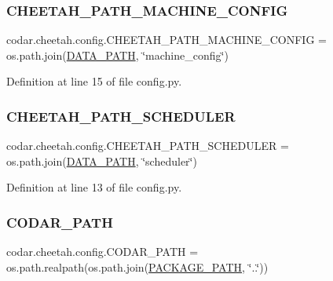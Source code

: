 \subsubsection{\texorpdfstring{C\+H\+E\+E\+T\+A\+H\+\_\+\+P\+A\+T\+H\+\_\+\+M\+A\+C\+H\+I\+N\+E\+\_\+\+C\+O\+N\+F\+IG}{CHEETAH\_PATH\_MACHINE\_CONFIG}}
{\footnotesize\ttfamily codar.\+cheetah.\+config.\+C\+H\+E\+E\+T\+A\+H\+\_\+\+P\+A\+T\+H\+\_\+\+M\+A\+C\+H\+I\+N\+E\+\_\+\+C\+O\+N\+F\+IG = os.\+path.\+join(\hyperlink{namespacecodar_1_1cheetah_1_1config_a87c807c2d48e4f9bb206c1d6afde26b5}{D\+A\+T\+A\+\_\+\+P\+A\+TH}, \char`\"{}machine\+\_\+config\char`\"{})}



Definition at line 15 of file config.\+py.

\mbox{\label{namespacecodar_1_1cheetah_1_1config_ae6c35df28d3aa0b6f7095d2d0c7d3dc8}} 
\subsubsection{\texorpdfstring{C\+H\+E\+E\+T\+A\+H\+\_\+\+P\+A\+T\+H\+\_\+\+S\+C\+H\+E\+D\+U\+L\+ER}{CHEETAH\_PATH\_SCHEDULER}}
{\footnotesize\ttfamily codar.\+cheetah.\+config.\+C\+H\+E\+E\+T\+A\+H\+\_\+\+P\+A\+T\+H\+\_\+\+S\+C\+H\+E\+D\+U\+L\+ER = os.\+path.\+join(\hyperlink{namespacecodar_1_1cheetah_1_1config_a87c807c2d48e4f9bb206c1d6afde26b5}{D\+A\+T\+A\+\_\+\+P\+A\+TH}, \char`\"{}scheduler\char`\"{})}



Definition at line 13 of file config.\+py.

\mbox{\label{namespacecodar_1_1cheetah_1_1config_a4ee1eac654271fe0e95d5c67599937a1}} 
\subsubsection{\texorpdfstring{C\+O\+D\+A\+R\+\_\+\+P\+A\+TH}{CODAR\_PATH}}
{\footnotesize\ttfamily codar.\+cheetah.\+config.\+C\+O\+D\+A\+R\+\_\+\+P\+A\+TH = os.\+path.\+realpath(os.\+path.\+join(\hyperlink{namespacecodar_1_1cheetah_1_1config_ac3d4a0bd20d4e47ccdcd4ddb6303c1ab}{P\+A\+C\+K\+A\+G\+E\+\_\+\+P\+A\+TH}, \char`\"{}..\char`\"{}))}



